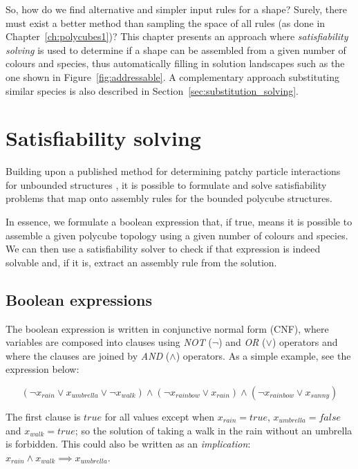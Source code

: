So, how do we find alternative and simpler input rules for a shape? Surely, there must exist a better method than sampling the space of all rules (as done in Chapter~\ref{ch:polycubes1})? This chapter presents an approach where \emph{satisfiability solving} is used to determine if a shape can be assembled from a given number of colours and species, thus automatically filling in solution landscapes such as the one shown in Figure~\ref{fig:addressable}. A complementary approach substituting similar species is also described in Section~\ref{sec:substitution_solving}.


\section{Satisfiability solving}

Building upon a published method for determining patchy particle interactions for unbounded structures \cite{romano2020designing}, it is possible to formulate and solve satisfiability problems that map onto assembly rules for the bounded polycube structures.

In essence, we formulate a boolean expression that, if true, means it is possible to assemble a given polycube topology using a given number of colours and species. We can then use a satisfiability solver to check if that expression is indeed solvable and, if it is, extract an assembly rule from the solution.

\subsection{Boolean expressions}

The boolean expression is written in conjunctive normal form (CNF), where variables are composed into clauses using \emph{NOT} (\(\lnot\)) and \emph{OR} (\(\lor\)) operators and where the clauses are joined by \emph{AND} (\(\land\)) operators. As a simple example, see the expression below:

\[
    (\lnot x_{rain} \lor x_{umbrella} \lor  \lnot x_{walk}) \land
    (\lnot x_{rainbow} \lor x_{rain}) \land
    (\lnot x_{rainbow} \lor x_{sunny})
\]

The first clause is \({true}\) for all values except when \(x_{rain}={true}\), \(x_{umbrella}={false}\) and \(x_{walk}=true\); so the solution of taking a walk in the rain without an umbrella is forbidden. This could also be written as an \emph{implication}: \(x_{rain} \land x_{walk} \implies x_{umbrella}\).

